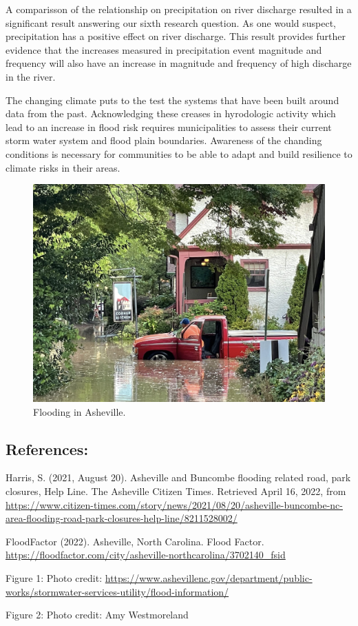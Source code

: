\documentclass[
]{article}
\begin{document}
A comparisson of the relationship on precipitation on river discharge
resulted in a significant result answering our sixth research question.
As one would suspect, precipitation has a positive effect on river
discharge. This result provides further evidence that the increases
measured in precipitation event magnitude and frequency will also have
an increase in magnitude and frequency of high discharge in the river.

The changing climate puts to the test the systems that have been built
around data from the past. Acknowledging these creases in hyrodologic
activity which lead to an increase in flood risk requires municipalities
to assess their current storm water system and flood plain boundaries.
Awareness of the chanding conditions is necessary for communities to be
able to adapt and build resilience to climate risks in their areas.

\begin{figure}

{\centering \includegraphics[width=0.75\linewidth]{Photo_1} 

}

\caption{Flooding in Asheville.}\label{fig:unnamed-chunk-16}
\end{figure}

\newpage

\hypertarget{references}{%
\subsection{\texorpdfstring{\textbf{References:}}{References:}}\label{references}}

Harris, S. (2021, August 20). Asheville and Buncombe flooding related
road, park closures, Help Line. The Asheville Citizen Times. Retrieved
April 16, 2022, from
\url{https://www.citizen-times.com/story/news/2021/08/20/asheville-buncombe-nc-area-flooding-road-park-closures-help-line/8211528002/}

FloodFactor (2022). Asheville, North Carolina. Flood Factor.
\url{https://floodfactor.com/city/asheville-northcarolina/3702140_fsid}

Figure 1: Photo credit:
\url{https://www.ashevillenc.gov/department/public-works/stormwater-services-utility/flood-information/}

Figure 2: Photo credit: Amy Westmoreland
\end{document}
